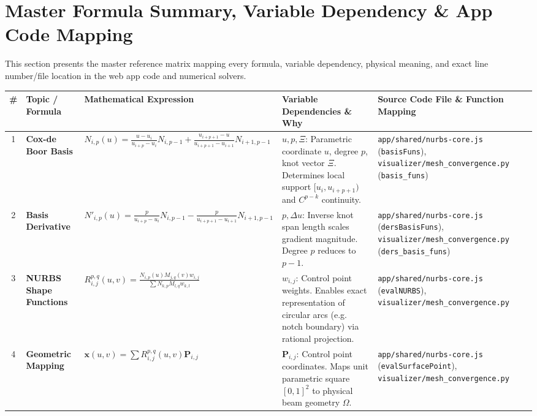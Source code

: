 \section{Master Formula Summary, Variable Dependency \& App Code Mapping}
\label{sec:formula_summary_mapping}

This section presents the master reference matrix mapping every formula, variable dependency, physical meaning, and exact line number/file location in the web app code and numerical solvers.

\begin{landscape}
\begin{center}
\small
\begin{longtable}{|c|p{3.5cm}|p{6cm}|p{6cm}|p{6cm}|}
\hline
\textbf{\#} & \textbf{Topic / Formula} & \textbf{Mathematical Expression} & \textbf{Variable Dependencies \& Why} & \textbf{Source Code File \& Function Mapping} \\
\hline
\endhead

1 & \textbf{Cox-de Boor Basis} & $N_{i,p}(u) = \frac{u - u_i}{u_{i+p} - u_i} N_{i,p-1} + \frac{u_{i+p+1} - u}{u_{i+p+1} - u_{i+1}} N_{i+1,p-1}$ & $u, p, \Xi$: Parametric coordinate $u$, degree $p$, knot vector $\Xi$. Determines local support $[u_i, u_{i+p+1})$ and $C^{p-k}$ continuity. & \texttt{app/shared/nurbs-core.js} (\texttt{basisFuns}), \texttt{visualizer/mesh\_convergence.py} (\texttt{basis\_funs}) \\
\hline

2 & \textbf{Basis Derivative} & $N'_{i,p}(u) = \frac{p}{u_{i+p}-u_i}N_{i,p-1} - \frac{p}{u_{i+p+1}-u_{i+1}}N_{i+1,p-1}$ & $p, \Delta u$: Inverse knot span length scales gradient magnitude. Degree $p$ reduces to $p-1$. & \texttt{app/shared/nurbs-core.js} (\texttt{dersBasisFuns}), \texttt{visualizer/mesh\_convergence.py} (\texttt{ders\_basis\_funs}) \\
\hline

3 & \textbf{NURBS Shape Functions} & $R_{i,j}^{p,q}(u,v) = \frac{N_{i,p}(u) M_{j,q}(v) w_{i,j}}{\sum N_{k,p} M_{l,q} w_{k,l}}$ & $w_{i,j}$: Control point weights. Enables exact representation of circular arcs (e.g. notch boundary) via rational projection. & \texttt{app/shared/nurbs-core.js} (\texttt{evalNURBS}), \texttt{visualizer/mesh\_convergence.py} \\
\hline

4 & \textbf{Geometric Mapping} & $\mathbf{x}(u,v) = \sum R_{i,j}^{p,q}(u,v) \mathbf{P}_{i,j}$ & $\mathbf{P}_{i,j}$: Control point coordinates. Maps unit parametric square $[0,1]^2$ to physical beam geometry $\Omega$. & \texttt{app/shared/nurbs-core.js} (\texttt{evalSurfacePoint}), \texttt{visualizer/mesh\_convergence.py} \\
\hline


\end{longtable}
\end{center}
\end{landscape}
